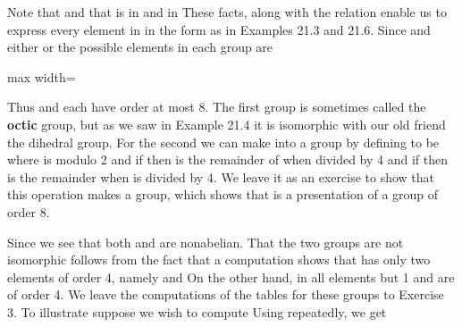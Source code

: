 \documentclass[11pt,oneside]{article}
\begin{document}
\begin{BookBody}
Note that  and that  is  in  and  in  These facts, along with the relation  enable us to express every element in  in the form  as in Examples 21.3 and 21.6. Since  and either  or  the possible elements in each group are

\begin{center}\begin{adjustbox}{max width=\linewidth}\end{adjustbox}\end{center}

\noindent Thus  and  each have order at most 8. The first group  is sometimes called the \textbf{octic} group, but as we saw in Example 21.4 it is isomorphic with our old friend  the dihedral group. For the second we can make  into a group by defining  to be  where  is  modulo 2 and if  then  is the remainder of  when divided by 4 and if  then  is the remainder when  is divided by 4. We leave it as an exercise to show that this operation makes  a group, which shows that  is a presentation of a group of order 8.

Since  we see that both  and  are nonabelian. That the two groups are not isomorphic follows from the fact that a computation shows that  has only two elements of order 4, namely and  On the other hand, in  all elements but 1 and  are of order 4. We leave the computations of the tables for these groups 
to Exercise 3. To illustrate suppose we wish to compute  Using  repeatedly, we get

\end{BookBody}
\end{document}

